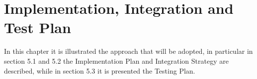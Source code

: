\chapter{Implementation, Integration and Test Plan}

In this chapter it is illustrated the approach that will be adopted, in particular in section 5.1 and 5.2 the Implementation Plan and Integration Strategy are described, while in section 5.3 it is presented the Testing Plan.


